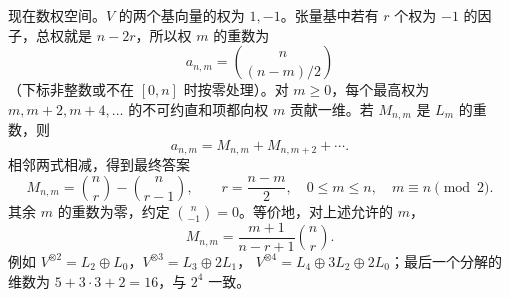 \begin{solution}
现在数权空间。$V$ 的两个基向量的权为 $1,-1$。张量基中若有 $r$ 个权为 $-1$ 的因子，总权就是 $n-2r$，所以权 $m$ 的重数为
\[
 a_{n,m}=\binom n{(n-m)/2}
\]
（下标非整数或不在 $[0,n]$ 时按零处理）。对 $m\ge0$，每个最高权为 $m,m+2,m+4,\ldots$ 的不可约直和项都向权 $m$ 贡献一维。若 $M_{n,m}$ 是 $L_m$ 的重数，则
\[
 a_{n,m}=M_{n,m}+M_{n,m+2}+\cdots.
\]
相邻两式相减，得到最终答案
\[
 \boxed{\displaystyle
 M_{n,m}=\binom n r-\binom n{r-1},\qquad r=\frac{n-m}{2},
 \quad 0\le m\le n,\quad m\equiv n\pmod2.}
\]
其余 $m$ 的重数为零，约定 $\binom n{-1}=0$。等价地，对上述允许的 $m$，
\[
 M_{n,m}=\frac{m+1}{n-r+1}\binom n r.
\]
例如 $V^{\otimes2}=L_2\oplus L_0$，$V^{\otimes3}=L_3\oplus2L_1$，
$V^{\otimes4}=L_4\oplus3L_2\oplus2L_0$；最后一个分解的维数为 $5+3\cdot3+2=16$，与 $2^4$ 一致。
\end{solution}
